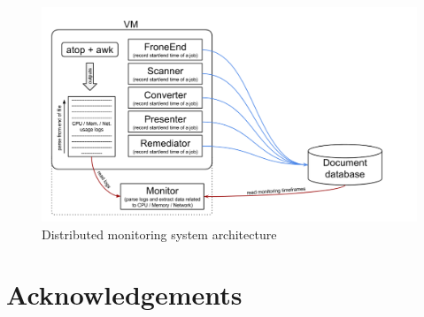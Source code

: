\documentclass[fleqn,10pt]{./class/wlscirep}
\begin{document}
\begin{figure}[ht]
\centering
\includegraphics[width=\linewidth]{./img/MonitoringCPUMechanismExtended.png}
\caption{Distributed monitoring system architecture}
\label{fig:monitoringArchitectureExtended}
\end{figure}






\section*{Acknowledgements}
\end{document}
